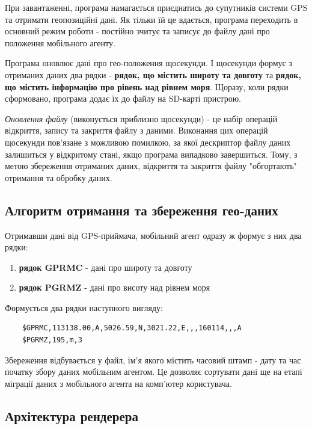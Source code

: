 \documentclass[simple,a4paper,14pt,ukrainian,utf8]{eskdtext}
\begin{document}
	При завантаженні, програма намагається приєднатись до супутників системи GPS та отримати геопозиційні дані. Як тільки їй це вдається, програма переходить в основний режим роботи - постійно зчитує та записує до файлу дані про положення мобільного агенту.
	
	Програма оновлює дані про гео-положення щосекунди. І щосекунди формує з отриманих даних два рядки - \textbf{рядок, що містить широту та довготу} та \textbf{рядок, що містить інформацію про рівень над рівнем моря}. Щоразу, коли рядки сформовано, програма додає їх до файлу на SD-карті пристрою.
	
	\textit{Оновлення файлу} (виконується приблизно щосекунди) - це набір операцій відкриття, запису та закриття файлу з даними. Виконання цих операцій щосекунди пов’язане з можливою помилкою, за якої дескриптор файлу даних залишиться у відкритому стані, якщо програма випадково завершиться. Тому, з метою збереження отриманих даних, відкриття та закриття файлу "обгортають" отримання та обробку даних.
        
    \subsection{Алгоритм отримання та збереження гео-даних}
    
    Отримавши дані від GPS-приймача, мобільний агент одразу ж формує з них два рядки:
    
    \begin{enumerate}
    	\item \textbf{рядок GPRMC} - дані про широту та довготу
    	\item \textbf{рядок PGRMZ} - дані про висоту над рівнем моря
    \end{enumerate}
    
	Формується два рядки наступного вигляду:
	
	\begin{lstlisting}
	$GPRMC,113138.00,A,5026.59,N,3021.22,E,,,160114,,,A
	$PGRMZ,195,m,3
	\end{lstlisting}
    
    Збереження відбувається у файл, ім’я якого містить часовий штамп - дату та час початку збору даних мобільним агентом. Це дозволяє сортувати дані ще на етапі міграції даних з мобільного агента на комп’ютер користувача.

    \subsection{Архітектура рендерера}
\end{document}
